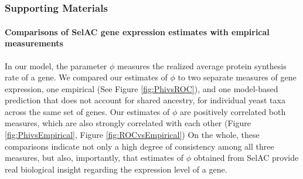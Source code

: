 \documentclass{article}
\begin{document}
\setcounter{equation}{0}
\appendix
\part*{\appendixname}

\section*{Supporting Materials}

\subsection*{Comparisons of SelAC gene expression estimates with empirical measurements}

In our model, the parameter $\phi$ measures the realized average protein synthesis rate of a gene. 
We compared our estimates of $\phi$ to two separate measures of gene expression, one empirical (See Figure \ref{fig:PhivsROC}), and one model-based prediction that does not account for shared ancestry, for individual yeast taxa across the same set of genes. 
Our estimates of $\phi$ are positively correlated both measures, which are also strongly correlated with each other (Figure \ref{fig:PhivsEmpirical}, Figure \ref{fig:ROCvsEmpirical}) 
On the whole, these comparisons indicate not only a high degree of consistency among all three measures, but also, importantly, that estimates of $\phi$ obtained from SelAC provide real biological insight regarding the expression level of a gene.
\end{document}
